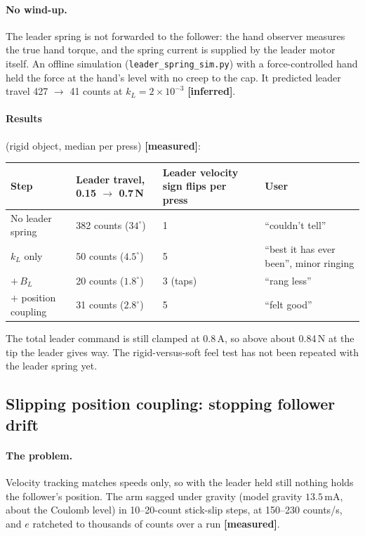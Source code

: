 \documentclass[11pt,a4paper]{article}
\newcommand{\mA}{\,\mathrm{mA}}
\newcommand{\file}[1]{\texttt{#1}}
\newcommand{\measured}{\textcolor{teal!70!black}{\textbf{[measured]}}}
\newcommand{\inferred}{\textcolor{orange!80!black}{\textbf{[inferred]}}}
\begin{document}
\paragraph{No wind-up.} The leader spring is not forwarded to the
follower: the hand observer measures the true hand torque, and the spring
current is supplied by the leader motor itself. An offline simulation
(\file{leader\_spring\_sim.py}) with a force-controlled hand held the force
at the hand's level with no creep to the cap. It predicted leader travel
427 $\to$ 41 counts at $k_L = 2\times10^{-3}$ \inferred.

\paragraph{Results} (rigid object, median per press) \measured:
\begin{center}
\small
\begin{tabular}{@{}>{\raggedright}p{3.1cm}>{\raggedright}p{3.4cm}>{\raggedright}p{2.6cm}>{\raggedright\arraybackslash}p{5.2cm}@{}}
\toprule
Step & Leader travel, 0.15 $\to$ 0.7\,N & Leader velocity sign flips per press & User \\
\midrule
No leader spring & 382 counts ($34^\circ$) & 1 & ``couldn't tell'' \\
$k_L$ only & 50 counts ($4.5^\circ$) & 5 & ``best it has ever been'', minor ringing \\
$+\,B_L$ & 20 counts ($1.8^\circ$) & 3 (taps) & ``rang less'' \\
$+$ position coupling & 31 counts ($2.8^\circ$) & 5 & ``felt good'' \\
\bottomrule
\end{tabular}
\end{center}
The total leader command is still clamped at 0.8\,A, so above about
0.84\,N at the tip the leader gives way. The rigid-versus-soft feel test
has not been repeated with the leader spring yet.

\subsection{Slipping position coupling: stopping follower drift}
\label{sec:poscoupling}

\paragraph{The problem.} Velocity tracking matches speeds only, so with the
leader held still nothing holds the follower's position. The arm sagged
under gravity (model gravity $13.5\mA$, about the Coulomb level) in
10--20-count stick-slip steps, at 150--230 counts/s, and $e$ ratcheted to
thousands of counts over a run \measured.
\end{document}

